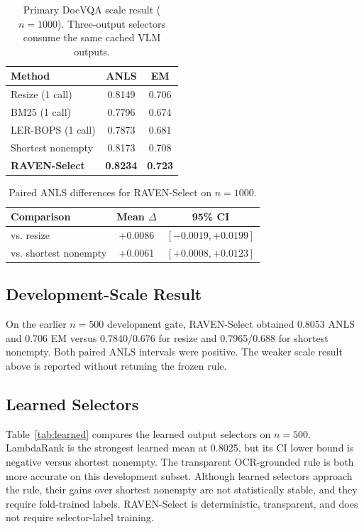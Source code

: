 \documentclass[journal]{IEEEtran}
\begin{document}
\begin{table}[t]
\centering
\caption{Primary DocVQA scale result ($n=1000$). Three-output selectors consume
the same cached VLM outputs.}
\label{tab:main1000}
\begin{tabular}{lcc}
\toprule
Method & ANLS & EM\\
\midrule
Resize (1 call) & 0.8149 & 0.706\\
BM25 (1 call) & 0.7796 & 0.674\\
LER-BOPS (1 call) & 0.7873 & 0.681\\
\midrule
Shortest nonempty & 0.8173 & 0.708\\
\textbf{RAVEN-Select} & \textbf{0.8234} & \textbf{0.723}\\
\bottomrule
\end{tabular}
\end{table}

\begin{table}[t]
\centering
\caption{Paired ANLS differences for RAVEN-Select on $n=1000$.}
\label{tab:ci}
\begin{tabular}{lcc}
\toprule
Comparison & Mean $\Delta$ & 95\% CI\\
\midrule
vs. resize & +0.0086 & $[-0.0019,+0.0199]$\\
vs. shortest nonempty & +0.0061 & $[+0.0008,+0.0123]$\\
\bottomrule
\end{tabular}
\end{table}

\subsection{Development-Scale Result}
On the earlier $n=500$ development gate, RAVEN-Select obtained 0.8053 ANLS and
0.706 EM versus 0.7840/0.676 for resize and 0.7965/0.688 for shortest
nonempty.  Both paired ANLS intervals were positive.  The weaker scale result
above is reported without retuning the frozen rule.

\subsection{Learned Selectors}
Table~\ref{tab:learned} compares the learned output selectors on $n=500$.
LambdaRank is the strongest learned mean at 0.8025, but its CI lower bound is
negative versus shortest nonempty.  The transparent OCR-grounded rule is both
more accurate on this development subset.  Although learned selectors
approach the rule, their gains over shortest nonempty are not statistically
stable, and they require fold-trained labels.  RAVEN-Select is deterministic,
transparent, and does not require selector-label training.
\end{document}
